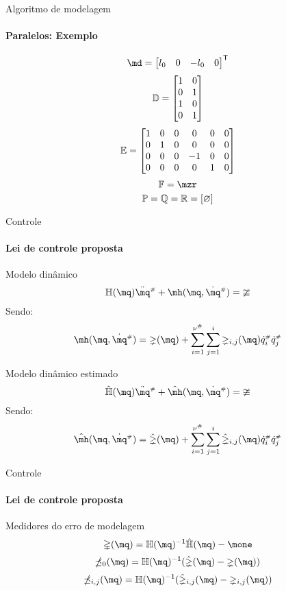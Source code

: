 \documentclass[25pt,landscape]{beamer}
\begin{document}
\begin{frame}{Algoritmo de modelagem}
    \framesubtitle{Paralelos: Exemplo}
    $$ \md = 
		\begin{bmatrix}
			l_0 &
			0 &
			-l_0 &
			0
		\end{bmatrix}^\msT $$
		$$ \mathbb{D} = 
		\begin{bmatrix}
			1 & 0 \\
			0 & 1 \\
			1 & 0 \\
			0 & 1 \\
		\end{bmatrix} $$
		$$ \mathbb{E} = 
		\begin{bmatrix}
			1 & 0 & 0 & 0 & 0 & 0 \\
			0 & 1 & 0 & 0 & 0 & 0 \\
			0 & 0 & 0 & -1 & 0 & 0 \\
			0 & 0 & 0 & 0 & 1 & 0 \\
		\end{bmatrix} $$
	$$ \mF = \mzr $$
	$$ 	\mathbb{P} = \mathbb{Q} = \mathbb{R} = \left[ \varnothing \right] $$
\end{frame}

\begin{frame}{Controle}
    \framesubtitle{Lei de controle proposta}
    \pause
    \begin{block}{Modelo din\^amico}
    	$$ \mH(\mq)  \ddot{\mq}\ssh + \mh(\mq,\dot{\mq}\ssh) = \mup $$
    	Sendo:
    	$$ \mh(\mq,\dot{\mq}\ssh) = \mgamma(\mq) + \sum_{i=1}^{\nu\ssh} \sum_{j=1}^i \mgamma_{i,j}(\mq) \dot{q}\ssh_i \dot{q}\ssh_j $$
    \end{block}
    \pause
   	\begin{block}{Modelo din\^amico estimado}
    	$$ \hat{\mH}(\mq)  \ddot{\mq}\ssh + \hat{\mh}(\mq,\dot{\mq}\ssh) = \mup $$
    	Sendo:
    	$$ \hat{\mh}(\mq,\dot{\mq}\ssh) = \hat{\mgamma}(\mq) + \sum_{i=1}^{\nu\ssh} \sum_{j=1}^i \hat{\mgamma}_{i,j}(\mq) \dot{q}\ssh_i \dot{q}\ssh_j $$
   	\end{block}
\end{frame}

\begin{frame}{Controle}
    \framesubtitle{Lei de controle proposta}
   	\begin{block}{Medidores do erro de modelagem}
   		$$ \mDelta(\mq) = \mH(\mq)^\msI \hat{\mH}(\mq) - \mone $$
    	$$ \mdelta_0(\mq) = \mH(\mq)^\msI (\hat{\mgamma}(\mq) - \mgamma(\mq)) $$
    	$$ \mdelta_{i,j}(\mq) = \mH(\mq)^\msI (\hat{\mgamma}_{i,j}(\mq) - \mgamma_{i,j}(\mq)) $$
   	\end{block}
\end{frame}
\end{document}
